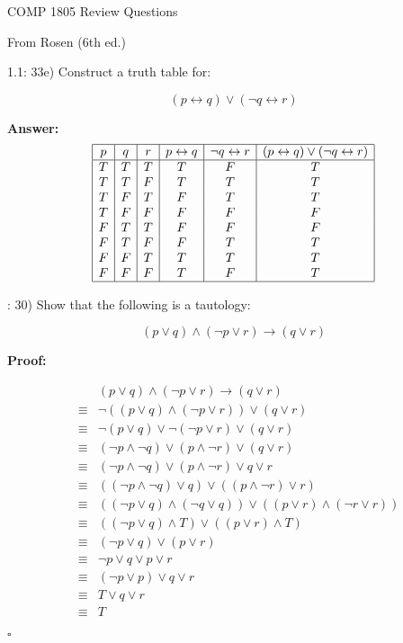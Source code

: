 \documentclass{article}
\newenvironment{proof}
{\color{PineGreen}\begin{list}{}%
         {\setlength{\leftmargin}{1cm}}%
         \item[]%
        \textbf{Proof:}
        
        }
{ $\square$\end{list}}
\newenvironment{answer}
{\color{PineGreen}\begin{list}{}%
         {\setlength{\leftmargin}{1cm}}%
         \item[]%
        \textbf{Answer: }}
{\end{list}}
\begin{document}
{\Huge COMP 1805 Review Questions}

From Rosen (6th ed.)

1.1: 33e) Construct a truth table for:

\[
(p \leftrightarrow q) \vee (\neg q \leftrightarrow r)
\]

\begin{answer}
\[\begin{array}{|c|c|c|c|c|c|}
\hline
p&q&r&p \leftrightarrow q&\neg q \leftrightarrow r&(p \leftrightarrow q) \vee (\neg q \leftrightarrow r)\\
\hline
T&T&T&T&F&T\\
T&T&F&T&T&T\\
T&F&T&F&T&T\\
T&F&F&F&F&F\\
F&T&T&F&F&F\\
F&T&F&F&T&T\\
F&F&T&T&T&T\\
F&F&F&T&F&T\\
\hline
\end{array}\]
\end{answer}
1.2: 30) Show that the following is a tautology:

\[
(p \vee q) \wedge (\neg p \vee r) \rightarrow (q \vee r)
\]

\begin{proof} 
\[\begin{array}{rcl}
&& (p \vee q) \wedge (\neg p \vee r) \rightarrow (q \vee r) \\
&\equiv& \neg((p \vee q) \wedge (\neg p \vee r)) \vee (q \vee r) \\
&\equiv& \neg(p \vee q) \vee \neg(\neg p \vee r) \vee (q \vee r) \\
&\equiv& (\neg p \wedge \neg q) \vee ( p \wedge \neg r) \vee (q \vee r) \\
&\equiv& (\neg p \wedge \neg q) \vee ( p \wedge \neg r) \vee q \vee r \\
&\equiv& ((\neg p \wedge \neg q) \vee q) \vee (( p \wedge \neg r) \vee r) \\
&\equiv& ((\neg p \vee q) \wedge (\neg q \vee q)) \vee ((p \vee r) \wedge (\neg r \vee r)) \\
&\equiv& ((\neg p \vee q) \wedge T) \vee ((p \vee r) \wedge T) \\
&\equiv& (\neg p \vee q) \vee (p \vee r) \\
&\equiv& \neg p \vee q \vee p \vee r \\
&\equiv& (\neg p \vee p) \vee q \vee r \\
&\equiv& T \vee q \vee r \\
&\equiv& T \\
\end{array}\]
\end{proof}
\end{document}
